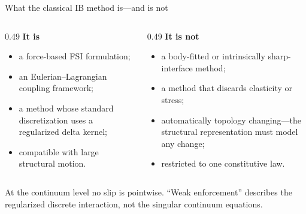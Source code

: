 \documentclass[aspectratio=169,11pt]{beamer}
\begin{document}
\begin{frame}{What the classical IB method is---and is not}
\begin{columns}[T,onlytextwidth]
\begin{column}{0.49\textwidth}
\textbf{It is}
\begin{itemize}\itemsep6pt
  \item a force-based FSI formulation;
  \item an Eulerian--Lagrangian coupling framework;
  \item a method whose standard discretization uses a regularized delta kernel;
  \item compatible with large structural motion.
\end{itemize}
\end{column}
\begin{column}{0.49\textwidth}
\textbf{It is not}
\begin{itemize}\itemsep6pt
  \item a body-fitted or intrinsically sharp-interface method;
  \item a method that discards elasticity or stress;
  \item automatically topology changing---the structural representation must model any change;
  \item restricted to one constitutive law.
\end{itemize}
\end{column}
\end{columns}
\begin{punchbox}
\small At the continuum level no slip is pointwise. ``Weak enforcement'' describes the regularized discrete interaction, not the singular continuum equations.
\end{punchbox}
\end{frame}
\end{document}
